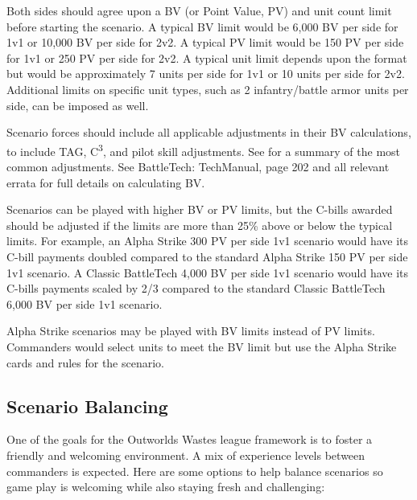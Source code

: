 \documentclass{article}
\begin{document}
Both sides should agree upon a BV (or Point Value, PV) and unit count limit before starting the scenario.
A typical BV limit would be 6,000 BV per side for 1v1 or 10,000 BV per side for 2v2.
A typical PV limit would be 150 PV per side for 1v1 or 250 PV per side for 2v2.
A typical unit limit depends upon the format but would be approximately 7 units per side for 1v1 or 10 units per side for 2v2.
Additional limits on specific unit types, such as 2 infantry/battle armor units per side, can be imposed as well.

Scenario forces should include all applicable adjustments in their BV calculations, to include TAG, C\textsuperscript{3}, and pilot skill adjustments.
See \pageref{sec:force_bv_adjustments} for a summary of the most common adjustments.
See BattleTech: TechManual, page 202 and all relevant errata for full details on calculating BV.

Scenarios can be played with higher BV or PV limits, but the C-bills awarded should be adjusted if the limits are more than 25\% above or below the typical limits.
For example, an Alpha Strike 300 PV per side 1v1 scenario would have its C-bill payments doubled compared to the standard Alpha Strike 150 PV per side 1v1 scenario.
A Classic BattleTech 4,000 BV per side 1v1 scenario would have its C-bills payments scaled by 2/3 compared to the standard Classic BattleTech 6,000 BV per side 1v1 scenario.

Alpha Strike scenarios may be played with BV limits instead of PV limits.
Commanders would select units to meet the BV limit but use the Alpha Strike cards and rules for the scenario.

\newpage

\subsection{Scenario Balancing}

One of the goals for the Outworlds Wastes league framework is to foster a friendly and welcoming environment.
A mix of experience levels between commanders is expected.
Here are some options to help balance scenarios so game play is welcoming while also staying fresh and challenging:
\end{document}
